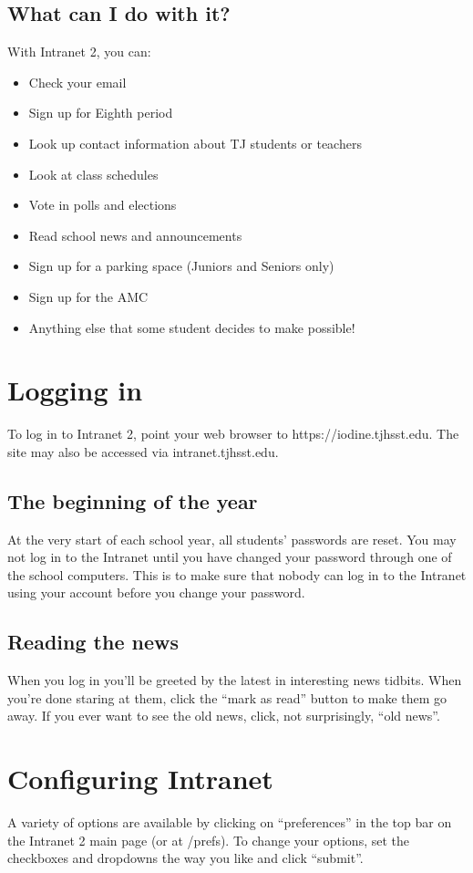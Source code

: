 \documentclass[11pt,letterpaper]{report}
\begin{document}
\subsection{What can I do with it?}
With Intranet 2, you can:
\begin{itemize}
\item Check your email
\item Sign up for Eighth period
\item Look up contact information about TJ students or teachers
\item Look at class schedules
\item Vote in polls and elections
\item Read school news and announcements
\item Sign up for a parking space (Juniors and Seniors only)
\item Sign up for the AMC
\item Anything else that some student decides to make possible!
\end{itemize}
\section{Logging in}
To log in to Intranet 2, point your web browser to https://iodine.tjhsst.edu.  
The site may also be accessed via intranet.tjhsst.edu.
\subsection{The beginning of the year}
At the very start of each school year, all students' passwords are reset.
You may not log in to the Intranet until you have changed your password through one of the school computers.
This is to make sure that nobody can log in to the Intranet using your account before you change your password.
\subsection{Reading the news}
When you log in you'll be greeted by the latest in interesting news tidbits.  When you're done staring at them,
click the ``mark as read'' button to make them go away.  If you ever want to see the old news, click, not surprisingly,
``old news''.
\section{Configuring Intranet}
A variety of options are available by clicking on ``preferences'' in the top bar on the 
Intranet 2 main page (or at /prefs).  To change your options, set the checkboxes and
dropdowns the way you like and click ``submit''.  
\end{document}
